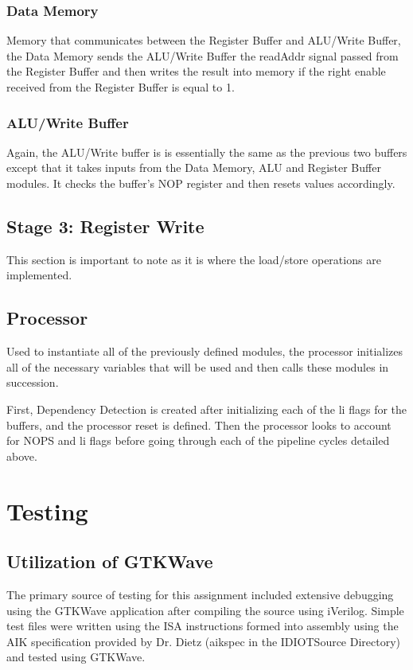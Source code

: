\documentclass[conference]{IEEEtran}
\begin{document}
\subsubsection{Data Memory}
Memory that communicates between the Register Buffer and ALU/Write Buffer, the 
Data Memory sends the ALU/Write Buffer the readAddr signal passed from the
Register Buffer and then writes the result into memory if the right enable received
from the Register Buffer is equal to 1.   

\subsubsection{ALU/Write Buffer}
Again, the ALU/Write buffer is is essentially the same as the previous two buffers 
except that it takes inputs from the Data Memory, ALU and Register Buffer modules.
It checks the buffer's NOP register and then resets values accordingly.

\subsection{Stage 3: Register Write}
 This section is important to note as it is where the load/store operations are implemented.

\subsection{Processor}
Used to instantiate all of the previously defined modules, the processor initializes all 
of the necessary variables that will be used and then calls these modules in succession.

First, Dependency Detection is created after initializing each of the li flags for the buffers, 
and the processor reset is defined. Then the processor looks to account for NOPS and 
li flags before going through each of the pipeline cycles detailed above.



\section{Testing}

\subsection{Utilization of GTKWave}
The primary source of testing for this assignment included extensive debugging using the 
GTKWave application after compiling the source using iVerilog. Simple test files were 
written using the ISA instructions formed into assembly using the AIK specification provided by Dr. Dietz (aikspec in the IDIOTSource Directory) and tested using GTKWave. 
\end{document}
